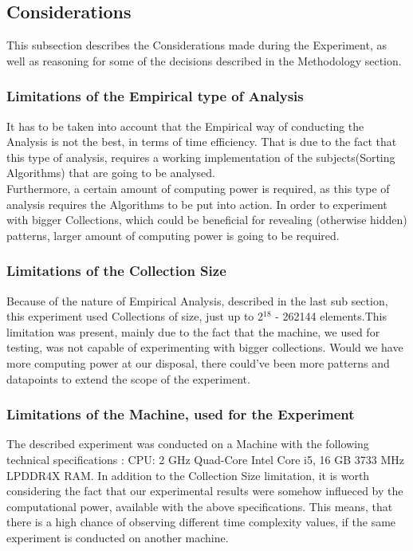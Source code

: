 \documentclass[]{report}
\begin{document}
\subsection{Considerations}
This subsection describes the Considerations made during the Experiment, as well as reasoning for some of the decisions described in the Methodology section.
\subsubsection{Limitations of the Empirical type of Analysis}
It has to be taken into account that the Empirical way of conducting the Analysis is not the best, in terms of time efficiency. That is due to the fact that this type of analysis, requires a working implementation of the subjects(Sorting Algorithms) that are going to be analysed. \\
Furthermore, a certain amount of computing power is required, as this type of analysis requires the Algorithms to be put into action. In order to experiment with bigger Collections, which could be beneficial for revealing (otherwise hidden) patterns, larger amount of computing power is going to be required. 

\subsubsection{Limitations of the Collection Size}
Because of the nature of Empirical Analysis, described in the last sub section, this experiment used Collections of size, just up to 2$^{18}$ - 262144 elements.This limitation was present, mainly due to the fact that the machine, we used for testing, was not capable of experimenting with bigger collections. Would we have more computing power at our disposal, there could've been more patterns and datapoints to extend the scope of the experiment.
\subsubsection{Limitations of the Machine, used for the Experiment}
The described experiment was conducted on a Machine with the following technical specifications : CPU: 2 GHz Quad-Core Intel Core i5, 16 GB 3733 MHz LPDDR4X RAM. In addition to the Collection Size limitation, it is worth considering the fact that our experimental results were somehow influeced by the computational power, available with the above specifications. This means, that there is a high chance of observing different time complexity values, if the same experiment is conducted on another machine.
\end{document}
